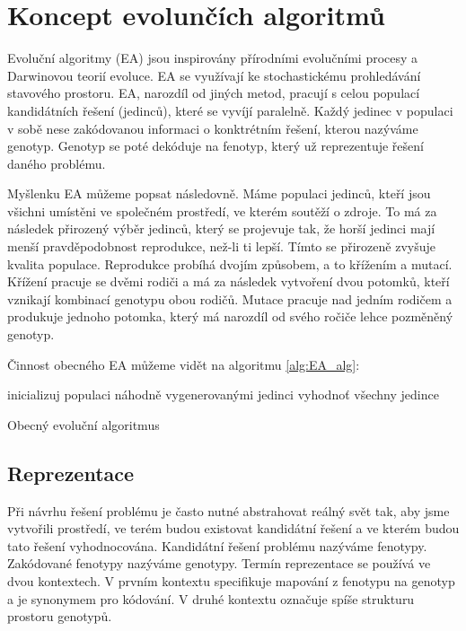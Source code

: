 \section{Koncept evolunčích algoritmů}

Evoluční algoritmy (EA) jsou inspirovány přírodními evolučními procesy a Darwinovou teorií evoluce.
EA se využívají ke stochastickému prohledávání stavového prostoru.
EA, narozdíl od jiných metod, pracují s celou populací kandidátních řešení (jedinců), které se vyvíjí paralelně.
Každý jedinec v populaci v sobě nese zakódovanou informaci o konktrétním řešení, kterou nazýváme genotyp.
Genotyp se poté dekóduje na fenotyp, který už reprezentuje řešení daného problému.

Myšlenku EA můžeme popsat následovně.
Máme populaci jedinců, kteří jsou všichni umístěni ve společném prostředí, ve kterém soutěží o zdroje.
To má za následek přirozený výběr jedinců, který se projevuje tak, že horší jedinci mají menší pravděpodobnost reprodukce, než-li ti lepší.
Tímto se přirozeně zvyšuje kvalita populace.
Reprodukce probíhá dvojím způsobem, a to křížením a mutací.
Křížení pracuje se dvěmi rodiči a má za následek vytvoření dvou potomků, kteří vznikají kombinací genotypu obou rodičů.
Mutace pracuje nad jedním rodičem a produkuje jednoho potomka, který má narozdíl od svého ročiče lehce pozměněný genotyp.

Činnost obecného EA můžeme vidět na algoritmu \ref{alg:EA_alg}:


\begin{algorithm}[H]
    inicializuj populaci náhodně vygenerovanými jedinci\;
    vyhodnoť všechny jedince\;
    \caption{Obecný evoluční algoritmus}
    \label{alg:EA_alg}
\end{algorithm}

\subsection{Reprezentace}
Při návrhu řešení problému je často nutné abstrahovat reálný svět tak, aby jsme vytvořili prostředí, ve terém budou existovat kandidátní řešení a ve kterém budou tato řešení vyhodnocována.
Kandidátní řešení problému nazýváme fenotypy.
Zakódované fenotypy nazýváme genotypy.
Termín reprezentace se používá ve dvou kontextech.
V prvním kontextu specifikuje mapování z fenotypu na genotyp a je synonymem pro kódování.
V druhé kontextu označuje spíše strukturu prostoru genotypů.

